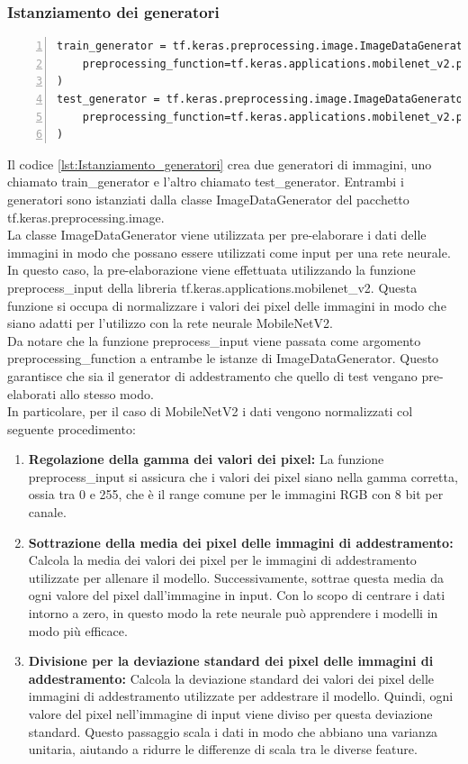 \documentclass[a4paper,final,12pt]{report}
\begin{document}
\newpage
\subsubsection{Istanziamento dei generatori}
\begin{lstlisting}[caption={Istanziamento dei generatori.}, label={lst:Istanziamento_generatori}, breaklines, escapechar=`\%, frame=lines, basicstyle=\small\ttfamily, keepspaces=true, numbers=left]
train_generator = tf.keras.preprocessing.image.ImageDataGenerator(
    preprocessing_function=tf.keras.applications.mobilenet_v2.preprocess_input,
)
test_generator = tf.keras.preprocessing.image.ImageDataGenerator(
    preprocessing_function=tf.keras.applications.mobilenet_v2.preprocess_input
)
\end{lstlisting}
Il codice \ref{lst:Istanziamento_generatori} crea due generatori di immagini, uno chiamato train\_generator e l'altro chiamato test\_generator. Entrambi i generatori sono istanziati dalla classe ImageDataGenerator del pacchetto tf.keras.preprocessing.image.\\
La classe ImageDataGenerator viene utilizzata per pre-elaborare i dati delle immagini in modo che possano essere utilizzati come input per una rete neurale. In questo caso, la pre-elaborazione viene effettuata utilizzando la funzione preprocess\_input della libreria tf.keras.applications.mobilenet\_v2. Questa funzione si occupa di normalizzare i valori dei pixel delle immagini in modo che siano adatti per l'utilizzo con la rete neurale MobileNetV2.\\
Da notare che la funzione preprocess\_input viene passata come argomento preprocessing\_function a entrambe le istanze di ImageDataGenerator. Questo garantisce che sia il generator di addestramento che quello di test vengano pre-elaborati allo stesso modo.\\
In particolare, per il caso di MobileNetV2 i dati vengono normalizzati col seguente procedimento:
\begin{enumerate}
    \item \textbf{Regolazione della gamma dei valori dei pixel:} La funzione preprocess\_input si assicura che i valori dei pixel siano nella gamma corretta, ossia tra 0 e 255, che è il range comune per le immagini RGB con 8 bit per canale.
    \item \textbf{Sottrazione della media dei pixel delle immagini di addestramento:} Calcola la media dei valori dei pixel per le immagini di addestramento utilizzate per allenare il modello. Successivamente, sottrae questa media da ogni valore del pixel dall'immagine in input. Con lo scopo di centrare i dati intorno a zero, in questo modo la rete neurale può apprendere i modelli in modo più efficace.
    \item \textbf{Divisione per la deviazione standard dei pixel delle immagini di addestramento:} Calcola la deviazione standard dei valori dei pixel delle immagini di addestramento utilizzate per addestrare il modello. Quindi, ogni valore del pixel nell'immagine di input viene diviso per questa deviazione standard. Questo passaggio scala i dati in modo che abbiano una varianza unitaria, aiutando a ridurre le differenze di scala tra le diverse feature.
\end{enumerate}
\end{document}
